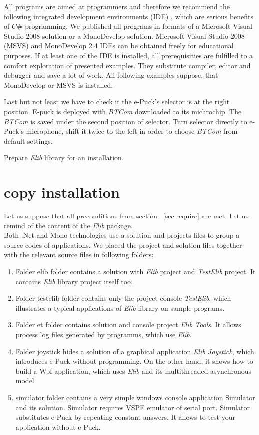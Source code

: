 	All programs are aimed at programmers and therefore we recommend the following integrated development environments (IDE) ,
	which are serious benefits of $C\#$ programming.
	We published all programs in formats of a Microsoft Visual Studio 2008 solution or a MonoDevelop solution.  
	Microsoft Visual Studio 2008 (MSVS) and MonoDevelop 2.4 IDEs can be obtained freely for educational purposes.
	If at least one of the IDE is installed, all prerequisities are fulfilled to a comfort exploration of presented examples. 
	They substitute compiler, editor and debugger and save a lot of work.
	All following examples suppose, that MonoDevelop or MSVS is installed.

	Last but not least we have to check it the e-Puck's selector is at the right position.
	E-puck is deployed with {\it BTCom} downloaded to its michrochip. 
	The {\it BTCom} is saved under the second position of selector. 
	Turn selector directly to e-Puck's microphone, shift it twice to the left 
	in order to choose {\it BTCom} from default settings.

	Prepare {\it Elib} library for an installation.
	
	\section{copy installation} \label{sec:copy}
	Let us suppose that all preconditions from section ~\ref{sec:require} are met.
	Let us remind of the content of the {\it Elib} package.\\

	Both .Net and Mono technologies use a solution and projects files to group a source codes of applications.
	We placed the project and solution files together with the relevant source files in following folders:

	\begin{enumerate}
		\item Folder { \sf elib} folder contains a solution with {\it Elib} project and {\it TestElib} project.
			It contains {\it Elib} library project itself too.
		\item Folder { \sf testelib} folder contains only the project console {\it TestElib}, 
		which illustrates a typical applications of {\it Elib} library on sample programs.
		\item Folder { \sf et} folder contains solution and console project {\it Elib Tools}. 
		It allows process log files generated by programms,
		which use {\it Elib}.
		\item Folder { \sf joystick} hides a solution of a graphical application {\it Elib Joystick},
		which introduces e-Puck without programming. On the other hand, it shows
		how to build a Wpf application, which uses {\it Elib} and its multithreaded asynchronous model.
		\item { \sf simulator} folder contains a very simple windows console application Simulator and its solution. 
		Simulator requires VSPE emulator of serial port. Simulator
		 substitutes e-Puck by repeating constant answers. It allows to test your application without e-Puck.
	\end{enumerate}

